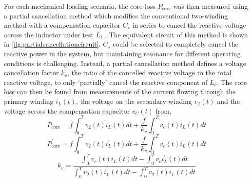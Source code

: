 \documentclass[conference]{IEEEtran}
\begin{document}
For each mechanical loading scenario, the core loss $P_\text{core}$ was then measured using a partial cancellation method which modifies the conventional two-winding method with a compensation capacitor $C_s$ in series to cancel the reactive voltage across the inductor under test $L_t$ \cite{houNewHighFrequencyCore2017}. 
The equivalent circuit of this method is shown in \cref{fig:partialcancellationcircuit}.
$C_s$ could be selected to completely cancel the reactive power in the system, but maintaining resonance for different operating conditions is challenging. 
Instead, a partial cancellation method defines a voltage cancellation factor $k_v$, the ratio of the cancelled reactive voltage to the total reactive voltage, to only `partially' cancel the reactive component of $L_t$. 
The core loss can then be found from measurements of the current flowing through the primary winding $i_L(t)$, the voltage on the secondary winding $v_2(t)$ and the voltage across the compensation capacitor $v_C(t)$ from, 
\begin{equation}
  P_\text{core} = f \int_0^T v_2(t)i_L(t)dt + \frac{f}{k_v} \int_0^T v_c(t)i_L(t) dt
\end{equation}
\begin{equation}
  P_\text{core}^{\prime} = f \int_0^T v_2(t)i_L^{\prime} (t)dt + \frac{f}{k_v} \int_0^T v_c(t)i_L^{\prime}(t) dt
\end{equation}
\begin{equation}
  k_v = \frac{\int_0^T v_c(t)i_L(t)dt - \int_0^T v_ci_L^\prime(t)dt}{\int_0^T v_2(t) i_L^\prime(t) dt - \int_0^T v_2(t) i_L(t) dt}
\end{equation}
\end{document}
